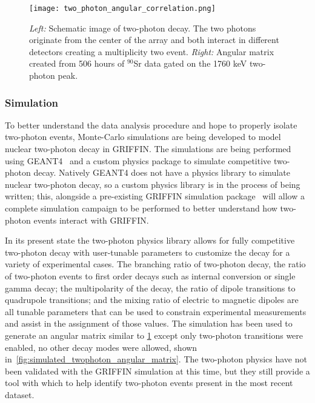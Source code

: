 \documentclass[cnatzke_thesis_proposal.tex]{subfiles}
\begin{document}
\begin{figure}[htbp]
  \centering
  \texttt{[image: two\_photon\_angular\_correlation.png]}
  \caption{
    \textit{Left:} Schematic image of two-photon decay. The two photons originate from the center of the array and both interact in different detectors creating a multiplicity two event.
    \textit{Right:} Angular matrix created from 506 hours of $^{90}$Sr data gated on the 1760 keV two-photon peak.
  }
  \label{fig:two_photon_angular_schematic}
\end{figure}

\subsubsection{Simulation}
\label{sec:simulation}
To better understand the data analysis procedure and hope to properly isolate two-photon events, Monte-Carlo simulations are being developed to model nuclear two-photon decay in GRIFFIN.
The simulations are being performed using GEANT4~\cite{allison_recent_2016} and a custom physics package to simulate competitive two-photon decay.
Natively GEANT4 does not have a physics library to simulate nuclear two-photon decay, so a custom physics library is in the process of being written; this, alongside a pre-existing GRIFFIN simulation package~\cite{v_bildstein_griffincollaborationdetectorsimulations_v10_2017} will allow a complete simulation campaign to be performed to better understand how two-photon events interact with GRIFFIN.

In its present state the two-photon physics library allows for fully competitive two-photon decay with user-tunable parameters to customize the decay for a variety of experimental cases.
The branching ratio of two-photon decay, the ratio of two-photon events to first order decays such as internal conversion or single gamma decay; the multipolarity of the decay, the ratio of dipole transitions to quadrupole transitions; and the mixing ratio of electric to magnetic dipoles are all tunable parameters that can be used to constrain experimental measurements and assist in the assignment of those values.
The simulation has been used to generate an angular matrix similar to \ref{fig:two_photon_angular_schematic} except only two-photon transitions were enabled, no other decay modes were allowed, shown in~\ref{fig:simulated_twophoton_angular_matrix}.
The two-photon physics have not been validated with the GRIFFIN simulation at this time, but they still provide a tool with which to help identify two-photon events present in the most recent dataset.
\end{document}
